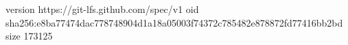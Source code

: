 version https://git-lfs.github.com/spec/v1
oid sha256:e8ba77474dac778748904d1a18a05003f74372c785482e878872fd77416bb2bd
size 173125
